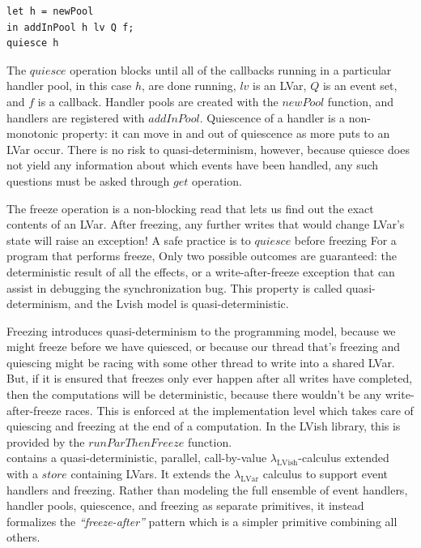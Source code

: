 \documentclass[twocolumn]{article}
\newcommand{\lambdaLVar}{\ensuremath{\lambda_{\textrm{LVar}}}}
\newcommand{\lambdaLVish}{\ensuremath{\lambda_{\textrm{LVish}}}}
\begin{document}
\begin{verbatim}
let h = newPool
in addInPool h lv Q f;
quiesce h
\end{verbatim}
The $quiesce$ operation blocks until all of the callbacks running in a particular handler pool, in this case $h$, are done running, $lv$ is an LVar, $Q$ is an event set, and $f$ is a callback. Handler pools are created with the $newPool$ function, and handlers are registered with $addInPool$. Quiescence of a handler is a non-monotonic property: it can move in and out of quiescence as more puts to an LVar occur. There is no risk to quasi-determinism, however, because quiesce does not yield any information about which events have been handled, any such questions must be asked through $get$ operation. 

The freeze operation is a non-blocking read that lets us find out the exact contents of an LVar. After freezing, any further writes that would change LVar's state will raise an exception! A safe practice is to $quiesce$ before freezing For a program that performs freeze, Only two possible outcomes are guaranteed: the deterministic result of all the effects, or a write-after-freeze exception that can assist in debugging the synchronization bug. This property is called quasi-determinism, and the Lvish model is
quasi-deterministic.

Freezing introduces quasi-determinism to the programming model, because we might freeze before we have quiesced, or because our thread that's freezing and quiescing might be racing with some other thread to write into a shared LVar. But, if it is ensured that freezes only ever happen after all writes have completed, then the computations will be deterministic, because there wouldn't be any write-after-freeze races. This is enforced at the implementation level which takes care of quiescing and
freezing at the end of a computation. In the LVish library, this is provided by the $runParThenFreeze$ function.\\
\cite{lkuper2}contains a quasi-deterministic, parallel, call-by-value $\lambdaLVish$-calculus extended with a $store$ containing LVars. It extends the $\lambdaLVar$ calculus to support event handlers and freezing. Rather than modeling the full ensemble of event handlers, handler pools, quiescence, and freezing as separate primitives, it instead formalizes the \emph{“freeze-after”} pattern which is a simpler primitive combining all others.
\end{document}
